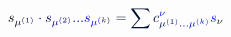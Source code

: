 \documentclass[12pt]{article}
\begin{document}
\makeatletter
\renewcommand*{\@textcolor}[3]{%
  \protect\leavevmode
  \begingroup
    \color#1{#2}#3%
  \endgroup
}
\makeatother
\begin{displaymath}
\mathcolor[RGB]{0,0,15}{s} _ { \mathcolor[RGB]{0,0,30}{\mu} ^ { \mathcolor[RGB]{0,0,45}{(} \mathcolor[RGB]{0,0,60}{1} \mathcolor[RGB]{0,0,75}{)} } } \mathcolor[RGB]{0,0,90}{\cdot} \mathcolor[RGB]{0,0,105}{s} _ { \mathcolor[RGB]{0,0,120}{\mu} ^ { \mathcolor[RGB]{0,0,135}{(} \mathcolor[RGB]{0,0,150}{2} \mathcolor[RGB]{0,0,165}{)} } } \mathcolor[RGB]{0,0,180}{.} \mathcolor[RGB]{0,0,195}{.} \mathcolor[RGB]{0,0,210}{.} \mathcolor[RGB]{0,0,225}{s} _ { \mathcolor[RGB]{0,0,240}{\mu} ^ { \mathcolor[RGB]{0,0,255}{(} \mathcolor[RGB]{0,15,0}{k} \mathcolor[RGB]{0,15,15}{)} } } \mathcolor[RGB]{0,15,30}{=} \mathcolor[RGB]{0,15,45}{\sum} \mathcolor[RGB]{0,15,60}{c} _ { \mathcolor[RGB]{0,15,75}{\mu} ^ { \mathcolor[RGB]{0,15,90}{(} \mathcolor[RGB]{0,15,105}{1} \mathcolor[RGB]{0,15,120}{)} } \mathcolor[RGB]{0,15,135}{.} \mathcolor[RGB]{0,15,150}{.} \mathcolor[RGB]{0,15,165}{.} \mathcolor[RGB]{0,15,180}{\mu} ^ { \mathcolor[RGB]{0,15,195}{(} \mathcolor[RGB]{0,15,210}{k} \mathcolor[RGB]{0,15,225}{)} } } ^ { \mathcolor[RGB]{0,15,240}{\nu} } \mathcolor[RGB]{0,15,255}{s} _ { \mathcolor[RGB]{0,30,0}{\nu} }
\end{displaymath}
\end{document}

